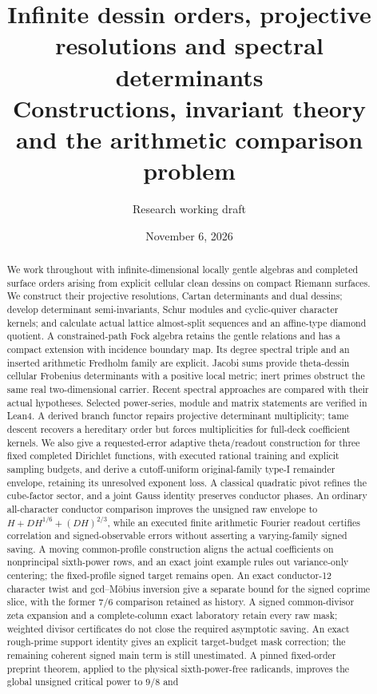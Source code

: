 
\usepackage{tikz-cd}
\newtheorem{corollary}[theorem]{Corollary}
\newcommand{\gshift}[2]{#1\langle #2\rangle}
\date{November 6, 2026}
\title{Infinite dessin orders, projective resolutions and spectral determinants\\\large Constructions, invariant theory and the arithmetic comparison problem}
\author{Research working draft}

\maketitle
\begin{abstract}
We work throughout with infinite-dimensional locally gentle algebras and completed surface orders arising from explicit cellular clean dessins on compact Riemann surfaces. We construct their projective resolutions, Cartan determinants and dual dessins; develop determinant semi-invariants, Schur modules and cyclic-quiver character kernels; and calculate actual lattice almost-split sequences and an affine-type diamond quotient. A constrained-path Fock algebra retains the gentle relations and has a compact extension with incidence boundary map. Its degree spectral triple and an inserted arithmetic Fredholm family are explicit. Jacobi sums provide theta-dessin cellular Frobenius determinants with a positive local metric; inert primes obstruct the same real two-dimensional carrier. Recent spectral approaches are compared with their actual hypotheses. Selected power-series, module and matrix statements are verified in Lean4. A derived branch functor repairs projective determinant multiplicity; tame descent recovers a hereditary order but forces multiplicities for full-deck coefficient kernels. We also give a requested-error adaptive theta/readout construction for three fixed completed Dirichlet functions, with executed rational training and explicit sampling budgets, and derive a cutoff-uniform original-family type-I remainder envelope, retaining its unresolved exponent loss. A classical quadratic pivot refines the cube-factor sector, and a joint Gauss identity preserves conductor phases. An ordinary all-character conductor comparison improves the unsigned raw envelope to $H+DH^{1/6}+(DH)^{2/3}$, while an executed finite arithmetic Fourier readout certifies correlation and signed-observable errors without asserting a varying-family signed saving. A moving common-profile construction aligns the actual coefficients on nonprincipal sixth-power rows, and an exact joint example rules out variance-only centering; the fixed-profile signed target remains open. An exact conductor-12 character twist and gcd--M\"obius inversion give a separate bound for the signed coprime slice, with the former $7/6$ comparison retained as history. A signed common-divisor zeta expansion and a complete-column exact laboratory retain every raw mask; weighted divisor certificates do not close the required asymptotic saving. An exact rough-prime support identity gives an explicit target-budget mask correction; the remaining coherent signed main term is still unestimated. A pinned fixed-order preprint theorem, applied to the physical sixth-power-free radicands, improves the global unsigned critical power to $9/8$ and 
\end{abstract}
